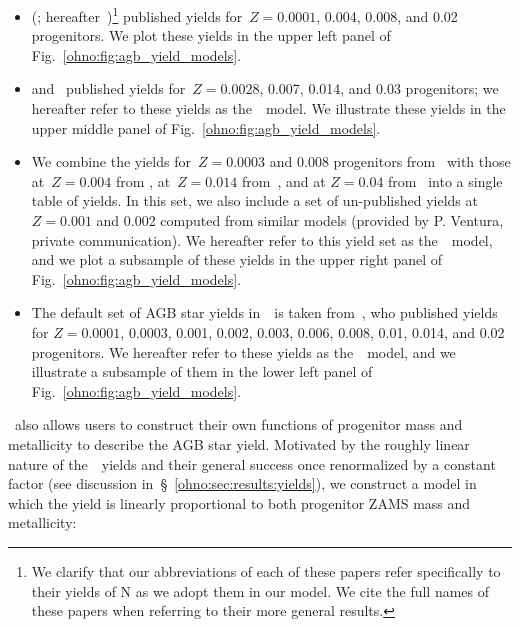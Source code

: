 \begin{itemize}
	\item[\textbf{1.}] \citeauthor{Karakas2010} (\citeyear{Karakas2010};
	hereafter~\karakasten)\footnote{
		We clarify that our abbreviations of each of these papers refer
		specifically to their yields of N as we adopt them in our model.
		We cite the full names of these papers when referring to their more
		general results.
	} published yields for~$Z = 0.0001$, 0.004, 0.008, and 0.02 progenitors.
	We plot these yields in the upper left panel of 
	Fig.~\ref{ohno:fig:agb_yield_models}.

	\item[\textbf{2.}] \citet{Karakas2016} and~\citet{Karakas2018} published
	yields for~$Z = 0.0028$, 0.007, 0.014, and 0.03 progenitors; we hereafter
	refer to these yields as the~\karakas~model.
	We illustrate these yields in the upper middle panel of
	Fig.~\ref{ohno:fig:agb_yield_models}.

	\item[\textbf{3.}] We combine the yields for~$Z = 0.0003$ and 0.008
	progenitors from~\citet{Ventura2013} with those at~$Z = 0.004$ from
	\citet{Ventura2014}, at~$Z = 0.014$ from~\citet{Ventura2018}, and at
	$Z = 0.04$ from~\citet{Ventura2020} into a single table of yields.
	In this set, we also include a set of un-published yields at~$Z = 0.001$
	and 0.002 computed from similar models (provided by P. Ventura, private
	communication).
	We hereafter refer to this yield set as the~\ventura~model, and we plot a
	subsample of these yields in the upper right panel of
	Fig.~\ref{ohno:fig:agb_yield_models}.

	\item[\textbf{4.}] The default set of AGB star yields in~\vice~is taken
	from~\citet{Cristallo2011, Cristallo2015}, who published yields for
	$Z = 0.0001$, 0.0003, 0.001, 0.002, 0.003, 0.006, 0.008, 0.01, 0.014, and
	0.02 progenitors.
	We hereafter refer to these yields as the~\cristallo~model, and we
	illustrate a subsample of them in the lower left panel of
	Fig.~\ref{ohno:fig:agb_yield_models}.
\end{itemize}
\par
\vice~also allows users to construct their own functions of progenitor mass
and metallicity to describe the AGB star yield.
Motivated by the roughly linear nature of the~\cristallo~yields and their
general success once renormalized by a constant factor (see discussion
in~\S~\ref{ohno:sec:results:yields}), we construct a model in which the yield is
linearly proportional to both progenitor ZAMS mass and metallicity:
